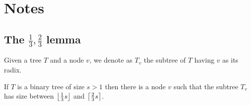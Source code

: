 

\chapter{Notes} \label{chap:notes}

\section{The $\frac{1}{3}, \frac{2}{3}$ lemma}

\begin{definition}
    Given a tree $T$ and a node $v$, we denote as $T_v$ the subtree of $T$ having $v$ as its radix. 
\end{definition}

\begin{lemma}
    \label{13_23_lewis}
    If $T$ is a binary tree of size $s > 1$ then there is a node $v$ such that the subtree $T_v$ has size between $\left \lfloor \frac{1}{3} s \right \rfloor$ and $\left \lceil \frac{2}{3} s \right \rceil$.
\end{lemma}

